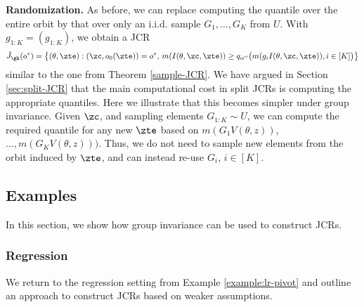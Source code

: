 \documentclass[english]{article}
\begin{document}
{\bf Randomization.} As before, we can replace computing the quantile over the entire orbit by that over only an i.i.d. sample $G_{1},\ldots,G_{K}$ from $U$. With $g_{1:K}=(g_{1:K})$, we obtain a JCR
\begin{align}\label{eq:sample-split}
    \tilde J_{\gk}(o^*) = \left\{(\theta,\zte):(\zc,o_0(\zte))=o^*,\, m(I(\theta,\zc,\zte)) \ge q_{\alpha''}\big( m(g_iI(\theta,\zc,\zte)),i\in[K]\big)\right\}
\end{align}
similar to the one from Theorem \ref{sample-JCR}.
We have argued in Section \ref{sec:split-JCR} 
that the main computational cost in split JCRs
is computing the appropriate quantiles. 
Here we illustrate that 
this becomes simpler
under group invariance.
Given $\zc$, 
and sampling elements $G_{1:K} \sim  U$,
we can compute the required quantile
for any new $\zte$ based on
$m(G_1V(\theta,z))$, $\ldots,m(G_KV(\theta,z)))$.
Thus, we do not need to sample new elements from the orbit induced by $\zte$, and can instead re-use $G_i$, $i\in[K]$.



\subsection{Examples}\label{conditional-invariance-JCR-example}
In this section, we show how group invariance can be used to construct JCRs.

\subsubsection{Regression}

We return to the regression setting from Example \ref{example:lr-pivot} and outline an approach to construct JCRs based on weaker assumptions.
\end{document}
